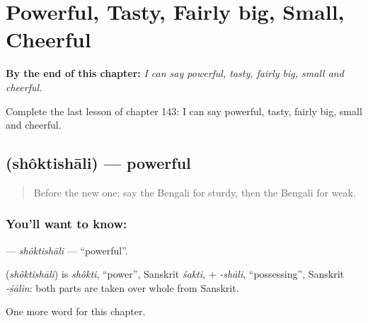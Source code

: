 
\chapter{Powerful, Tasty, Fairly big, Small, Cheerful}
\label{ch:bn-powerful-tasty-fairly-big-small-cheerful}

\begin{chapteropening}
\textbf{By the end of this chapter:} \emph{I can say powerful, tasty, fairly big, small and cheerful.}

Complete the last lesson of chapter 143: I can say powerful, tasty, fairly big, small and cheerful.
\end{chapteropening}

\section[\texorpdfstring{\bn{শক্তিশালী} (shôktishāli)}{শক্তিশালী (shôktishāli)}]{ (shôktishāli) — powerful}

\label{lesson:BN-C143-shoktishali}



\begin{quote}
Before the new one: say the Bengali for sturdy, then the Bengali for weak.
\end{quote}

\subsection*{You'll want to know: }
\textbf{} — \emph{shôktishāli} — \textquotedblleft{}powerful\textquotedblright{}.

\begin{cousinweb}
\textbf{} (\emph{shôktishāli}) is \emph{shôkti}, \textquotedblleft{}power\textquotedblright{}, Sanskrit \emph{śakti}, + \emph{-shāli}, \textquotedblleft{}possessing\textquotedblright{}, Sanskrit \emph{-śālin}: both parts are taken over whole from Sanskrit.
\end{cousinweb}

\begin{grammarlens}[title={What you've built}]
One more word for this chapter.
\end{grammarlens}

